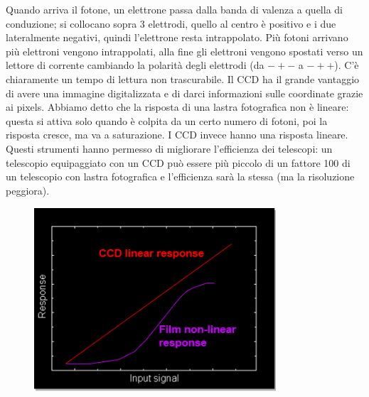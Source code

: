 \documentclass[a4paper,11pt]{article}
\begin{document}
\newline
\newpage
Quando arriva il fotone, un elettrone passa dalla banda di valenza a quella di conduzione; si collocano sopra 3 elettrodi, quello al centro è positivo e i due lateralmente negativi, quindi l’elettrone resta intrappolato. Più fotoni arrivano più elettroni vengono intrappolati, alla fine gli elettroni vengono spostati verso un lettore di corrente cambiando la polarità degli elettrodi (da $-+-$ a $-++$). C’è chiaramente un tempo di lettura non trascurabile. 
\newline
Il CCD ha il grande vantaggio di avere una immagine digitalizzata e di darci informazioni sulle coordinate grazie ai pixels. Abbiamo detto che la risposta di una lastra fotografica non è lineare: questa si attiva solo quando è colpita da un certo numero di fotoni, poi la risposta cresce, ma va a saturazione. I CCD invece hanno una risposta lineare. Questi strumenti hanno permesso di migliorare l’efficienza dei telescopi: un telescopio equipaggiato con un CCD può essere più piccolo di un fattore 100 di un telescopio con lastra fotografica e l’efficienza sarà la stessa (ma la risoluzione peggiora).
\newline
\begin{figure}[h!!]
        \centering
        \includegraphics[width=9cm]{astro5.png}
        \label{}
    \end{figure}
\newline
\end{document}
